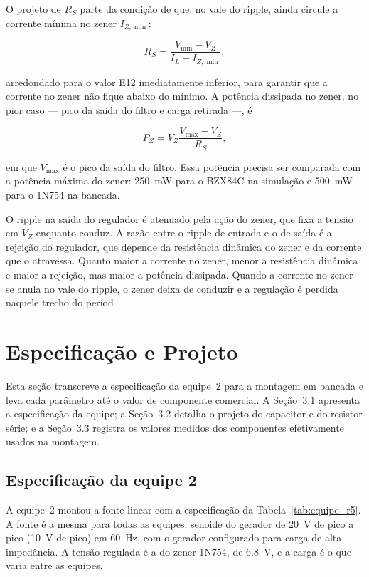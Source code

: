 \documentclass[11pt,a4paper]{article}
\begin{document}
O projeto de \(R_S\) parte da condição de que, no vale do ripple, ainda circule a corrente mínima no zener \(I_{Z,\min}\):
 
\begin{equation}
R_S = \frac{V_{\min} - V_Z}{I_L + I_{Z,\min}} ,
\label{eq:rs}
\end{equation}
 
arredondado para o valor E12 imediatamente inferior, para garantir que a corrente no zener não fique abaixo do mínimo. A potência dissipada no zener, no pior caso — pico da saída do filtro e carga retirada —, é
 
\begin{equation}
P_Z = V_Z \frac{V_{\max} - V_Z}{R_S} ,
\label{eq:pz}
\end{equation}
 
em que \(V_{\max}\) é o pico da saída do filtro. Essa potência precisa ser comparada com a potência máxima do zener: \SI{250}{\milli\watt} para o BZX84C na simulação e \SI{500}{\milli\watt} para o 1N754 na bancada.
 
O ripple na saída do regulador é atenuado pela ação do zener, que fixa a tensão em \(V_Z\) enquanto conduz. A razão entre o ripple de entrada e o de saída é a rejeição do regulador, que depende da resistência dinâmica do zener e da corrente que o atravessa. Quanto maior a corrente no zener, menor a resistência dinâmica e maior a rejeição, mas maior a potência dissipada. Quando a corrente no zener se anula no vale do ripple, o zener deixa de conduzir e a regulação é perdida naquele trecho do períod

\section{Especificação e Projeto}
 
Esta seção transcreve a especificação da equipe~2 para a montagem em bancada e leva cada parâmetro até o valor de componente comercial. A Seção~3.1 apresenta a especificação da equipe; a Seção~3.2 detalha o projeto do capacitor e do resistor série; e a Seção~3.3 registra os valores medidos dos componentes efetivamente usados na montagem.
 
\subsection{Especificação da equipe 2}
 
A equipe~2 montou a fonte linear com a especificação da Tabela~\ref{tab:equipe_r5}. A fonte é a mesma para todas as equipes: senoide do gerador de \SI{20}{\volt} de pico a pico (\SI{10}{\volt} de pico) em \SI{60}{\hertz}, com o gerador configurado para carga de alta impedância. A tensão regulada é a do zener 1N754, de \SI{6,8}{\volt}, e a carga é o que varia entre as equipes.
 
\end{document}
